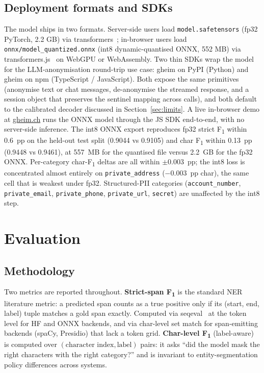 \documentclass[sigconf,nonacm]{acmart}
\begin{document}
\subsection{Deployment formats and SDKs}
\label{subsec:deployment}

The model ships in two formats. Server-side users load
\texttt{model.safetensors} (fp32 PyTorch, 2.2 GB) via
\textsf{transformers}~\cite{wolf2020transformers}; in-browser users load
\texttt{onnx/model\_quantized.onnx} (int8 dynamic-quantised ONNX,
552 MB) via \textsf{transformers.js}~\cite{transformersjs} on WebGPU
or WebAssembly. Two thin SDKs wrap the model for the
LLM-anonymisation round-trip use case: \textsf{gheim} on PyPI
(Python) and \textsf{gheim} on npm (TypeScript / JavaScript). Both
expose the same primitives (anonymise text or chat messages,
de-anonymise the streamed response, and a session object that
preserves the sentinel mapping across calls), and both default to
the calibrated decoder discussed in Section~\ref{sec:limits}. A
live in-browser demo at \href{https://gheim.ch}{gheim.ch} runs the
ONNX model through the JS SDK end-to-end, with no server-side
inference. The int8 ONNX export reproduces fp32 strict
F\textsubscript{1} within 0.6~pp on the held-out test split
(0.9044 vs 0.9105) and char F\textsubscript{1} within 0.13~pp
(0.9448 vs 0.9461), at 557~MB for the quantised file versus 2.2~GB
for the fp32 ONNX. Per-category char-F\textsubscript{1} deltas are
all within $\pm 0.003$~pp; the int8 loss is concentrated almost
entirely on \texttt{private\_address} ($-$0.003~pp char), the same
cell that is weakest under fp32. Structured-PII categories
(\texttt{account\_number}, \texttt{private\_email},
\texttt{private\_phone}, \texttt{private\_url},
\texttt{secret}) are unaffected by the int8 step.

\section{Evaluation}
\label{sec:eval}

\subsection{Methodology}

Two metrics are reported throughout. \textbf{Strict-span F\textsubscript{1}}
is the standard NER literature metric: a predicted span counts as a
true positive only if its (start, end, label) tuple matches a gold span
exactly. Computed via \textsf{seqeval}~\cite{nakayama2018seqeval} at
the token level for HF and ONNX backends, and via char-level set match
for span-emitting backends (spaCy, Presidio) that lack a token grid.
\textbf{Char-level F\textsubscript{1}} (label-aware) is computed over
$(\text{character index}, \text{label})$ pairs: it asks ``did the model
mask the right characters with the right category?'' and is invariant
to entity-segmentation policy differences across systems.
\end{document}
